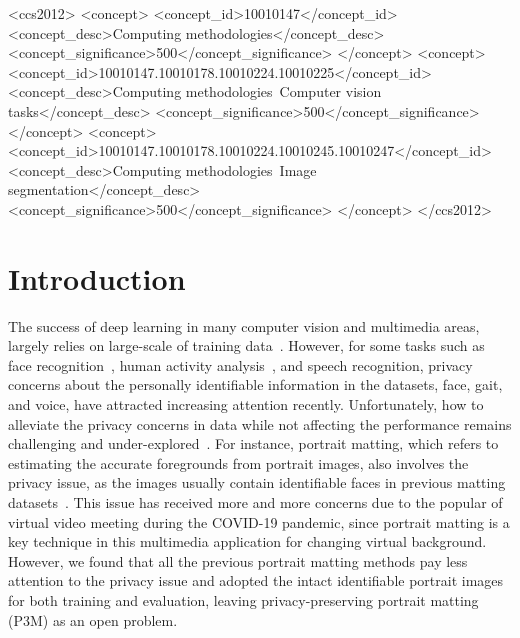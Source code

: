 \documentclass[sigconf]{acmart}
\begin{document}
\begin{CCSXML}
<ccs2012>
<concept>
<concept_id>10010147</concept_id>
<concept_desc>Computing methodologies</concept_desc>
<concept_significance>500</concept_significance>
</concept>
<concept>
<concept_id>10010147.10010178.10010224.10010225</concept_id>
<concept_desc>Computing methodologies~Computer vision tasks</concept_desc>
<concept_significance>500</concept_significance>
</concept>
<concept>
<concept_id>10010147.10010178.10010224.10010245.10010247</concept_id>
<concept_desc>Computing methodologies~Image segmentation</concept_desc>
<concept_significance>500</concept_significance>
</concept>
</ccs2012>
\end{CCSXML}



\maketitle

\section{Introduction}
The success of deep learning in many computer vision and multimedia areas, largely relies on large-scale of training data~\cite{zhang2020empowering}. However, for some tasks such as face recognition~\cite{masi2018deep}, human activity analysis~\cite{sun2019deep}, and speech recognition, privacy concerns about the personally identifiable information in the datasets,  face, gait, and voice, have attracted increasing attention recently. Unfortunately, how to alleviate the privacy concerns in data while not affecting the performance remains challenging and under-explored~\cite{yang2021study}. For instance, portrait matting, which refers to estimating the accurate foregrounds from portrait images, also involves the privacy issue, as the images usually contain identifiable faces in previous matting datasets~\cite{dim,hatt,dapm}. This issue has received more and more concerns due to the popular of virtual video meeting during the COVID-19 pandemic, since portrait matting is a key technique in this multimedia application for changing virtual background. However, we found that all the previous portrait matting methods pay less attention to the privacy issue and adopted the intact identifiable portrait images for both training and evaluation, leaving privacy-preserving portrait matting (P3M) as an open problem.
\end{document}
